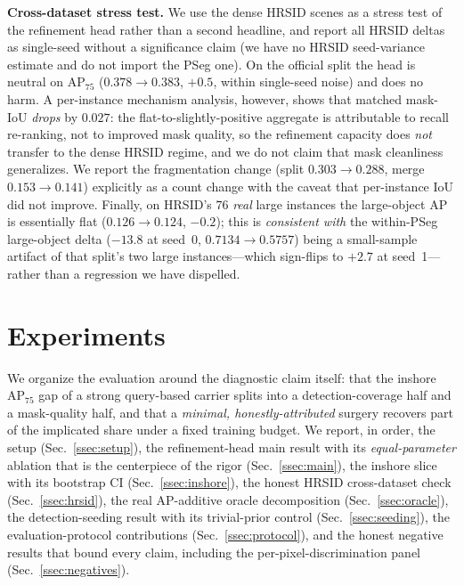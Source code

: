 \documentclass[journal]{IEEEtran}
\begin{document}
\textbf{Cross-dataset stress test.} We use the dense HRSID scenes as a stress test of the refinement head rather than a second headline, and report all HRSID deltas as single-seed without a significance claim (we have no HRSID seed-variance estimate and do not import the PSeg one). On the official split the head is neutral on AP$_{75}$ ($0.378\!\rightarrow\!0.383$, $+0.5$, within single-seed noise) and does no harm. A per-instance mechanism analysis, however, shows that matched mask-IoU \emph{drops} by $0.027$: the flat-to-slightly-positive aggregate is attributable to recall re-ranking, not to improved mask quality, so the refinement capacity does \emph{not} transfer to the dense HRSID regime, and we do not claim that mask cleanliness generalizes. We report the fragmentation change (split $0.303\!\rightarrow\!0.288$, merge $0.153\!\rightarrow\!0.141$) explicitly as a count change with the caveat that per-instance IoU did not improve. Finally, on HRSID's $76$ \emph{real} large instances the large-object AP is essentially flat ($0.126\!\rightarrow\!0.124$, $-0.2$); this is \emph{consistent with} the within-PSeg large-object delta ($-13.8$ at seed~0, $0.7134\!\rightarrow\!0.5757$) being a small-sample artifact of that split's two large instances---which sign-flips to $+2.7$ at seed~1---rather than a regression we have dispelled.

\section{Experiments}
\label{sec:experiments}
We organize the evaluation around the diagnostic claim itself: that the inshore AP$_{75}$ gap of a strong query-based carrier splits into a detection-coverage half and a mask-quality half, and that a \emph{minimal, honestly-attributed} surgery recovers part of the implicated share under a fixed training budget. We report, in order, the setup (Sec.~\ref{ssec:setup}), the refinement-head main result with its \emph{equal-parameter} ablation that is the centerpiece of the rigor (Sec.~\ref{ssec:main}), the inshore slice with its bootstrap CI (Sec.~\ref{ssec:inshore}), the honest HRSID cross-dataset check (Sec.~\ref{ssec:hrsid}), the real AP-additive oracle decomposition (Sec.~\ref{ssec:oracle}), the detection-seeding result with its trivial-prior control (Sec.~\ref{ssec:seeding}), the evaluation-protocol contributions (Sec.~\ref{ssec:protocol}), and the honest negative results that bound every claim, including the per-pixel-discrimination panel (Sec.~\ref{ssec:negatives}).
\end{document}

